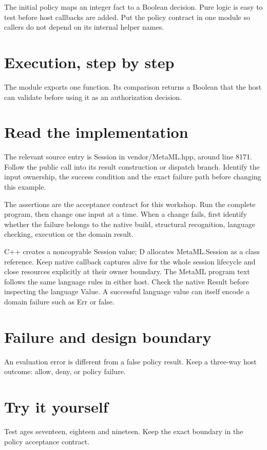 \clearpage
{}
The initial policy maps an integer fact to a Boolean decision. Pure logic is easy to test before host callbacks are added. Put the policy contract in one module so callers do not depend on its internal helper names.


\section*{Execution, step by step}
The module exports one function. Its comparison returns a Boolean that the host can validate before using it as an authorization decision.

\section*{Read the implementation}
The relevant source entry is Session in vendor/MetaML.hpp, around line 8171. Follow the public call into its result construction or dispatch branch. Identify the input ownership, the success condition and the exact failure path before changing this example.

The assertions are the acceptance contract for this workshop. Run the complete program, then change one input at a time. When a change fails, first identify whether the failure belongs to the native build, structural recognition, language checking, execution or the domain result.

\clearpage
{}
C++ creates a noncopyable Session value; D allocates MetaML.Session as a class reference. Keep native callback captures alive for the whole session lifecycle and close resources explicitly at their owner boundary. The MetaML program text follows the same language rules in either host. Check the native Result before inspecting the language Value. A successful language value can itself encode a domain failure such as Err or false.


\section*{Failure and design boundary}
An evaluation error is different from a false policy result. Keep a three-way host outcome: allow, deny, or policy failure.

\section*{Try it yourself}
Test ages seventeen, eighteen and nineteen. Keep the exact boundary in the policy acceptance contract.

